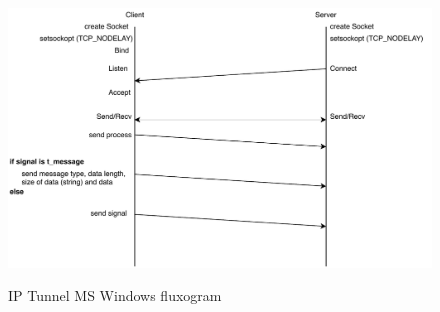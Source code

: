 \begin{figure}[hbt!]
	\centering
	\includegraphics{./lib/ip_tunnel_ms_windows/figures/FluxogramIPTunnel.pdf}
	\label{IP Tunnel Block}\caption{IP Tunnel MS Windows fluxogram}
\end{figure}

